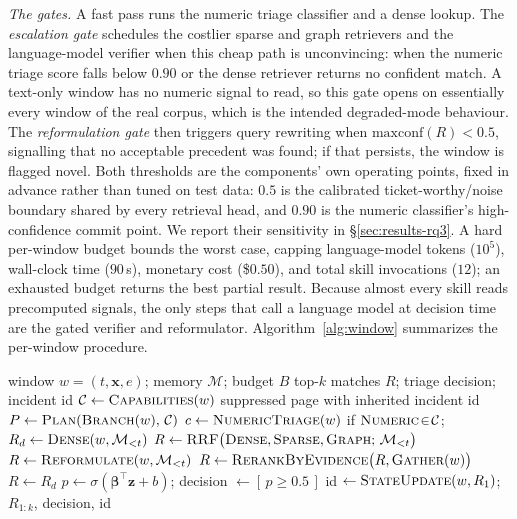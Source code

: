 \noindent\emph{The gates.} A fast pass runs the numeric triage classifier and a
dense lookup. The \emph{escalation gate} schedules the costlier sparse and graph
retrievers and the language-model verifier when this cheap path is unconvincing:
when the numeric triage score falls below $0.90$ or the dense retriever returns no
confident match. A text-only window has no numeric signal to read, so this gate
opens on essentially every window of the real corpus, which is the intended
degraded-mode behaviour. The \emph{reformulation gate} then triggers query
rewriting when $\mathrm{maxconf}(R)<0.5$, signalling that no acceptable precedent
was found; if that persists, the window is flagged novel. Both thresholds are the
components' own operating points, fixed in advance rather than tuned on test
data: $0.5$ is the calibrated ticket-worthy/noise boundary shared by every
retrieval head, and $0.90$ is the numeric classifier's high-confidence commit
point. We report their sensitivity in \S\ref{sec:results-rq3}. A
hard per-window budget bounds the worst case, capping language-model tokens
($10^5$), wall-clock time ($90$\,s), monetary cost (\$$0.50$), and total skill
invocations ($12$); an exhausted budget returns the best partial result. Because
almost every skill reads precomputed signals, the only steps that call a language
model at decision time are the gated verifier and reformulator.
Algorithm~\ref{alg:window} summarizes the per-window procedure.

\begin{algorithm}[t]
\caption{Per-window triage in \sys{}}
\label{alg:window}
\small
\begin{algorithmic}[1]
\Require window $w=(t,\mathbf{x},e)$; memory $\mathcal{M}$; budget $B$
\Ensure top-$k$ matches $R$; triage decision; incident id
\State $\mathcal{C}\gets \textsc{Capabilities}(w)$ 
  \State \Return suppressed page with inherited incident id
\EndIf
\State $P\gets \textsc{Plan}(\textsc{Branch}(w),\,\mathcal{C})$ 
\State $c\gets \textsc{NumericTriage}(w)$ if $\textsc{Numeric}\!\in\!\mathcal{C}$;\;\; $R_d\gets \textsc{Dense}(w,\mathcal{M}_{<t})$
 
  \State $R\gets \textsc{RRF}\big(\textsc{Dense},\textsc{Sparse},\textsc{Graph};\,\mathcal{M}_{<t}\big)$
   
    \State $R\gets \textsc{Reformulate}(w,\mathcal{M}_{<t})$
  \EndIf
    \State $R\gets \textsc{RerankByEvidence}\big(R,\textsc{Gather}(w)\big)$
  \EndIf
\Else
  \State $R\gets R_d$
\EndIf
\State $p\gets \sigma(\boldsymbol{\beta}^{\top}\mathbf{z}+b)$;\;\; decision $\gets [\,p\ge 0.5\,]$
\State id $\gets \textsc{StateUpdate}(w,R_1)$;\;\; \Return $R_{1:k}$, decision, id
\end{algorithmic}
\end{algorithm}

